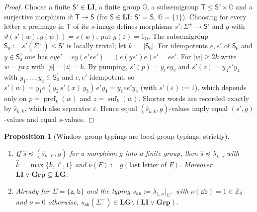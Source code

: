 \documentclass[11pt]{article}
\numberwithin{equation}{section}
\theoremstyle{plain}
\newtheorem{proposition}[theorem]{Proposition}
\theoremstyle{definition}
\theoremstyle{remark}
\newcommand{\eps}{\varepsilon}
\theoremstyle{plain}
\begin{document}
\begin{proof}
Choose a finite $\mathsf S'\in\mathbf{LI}$, a finite group ${\mathbb G}$, a subsemigroup
$\mathsf T\le \mathsf S'\times {\mathbb G}$ and a surjective morphism $\vartheta:\mathsf T\to\mathsf S$ (for
$\mathsf S\in\mathbf{LI}$: $\mathsf S'=\mathsf S$, ${\mathbb G}=\{1\}$).  Choosing for every letter a preimage in $\mathsf T$
of its $s$-image defines morphisms $s':\Sigma^+\to\mathsf S'$ and $g$ with
$\vartheta(s'(w),g(w))=s(w)$; put $g(\eps)=1_{\mathbb G}$.  The subsemigroup
$\mathsf S_0:=s'(\Sigma^+)\le \mathsf S'$ is locally trivial; let $k:=|\mathsf S_0|$.  For
idempotents $e,e'$ of $\mathsf S_0$ and $y\in \mathsf S_0^1$ one has
$eye'=ey(e'ee')=(e(ye')e)e'=ee'$.
For $|w|\ge2k$ write $w=pxz$ with $|p|=|z|=k$.  By pumping,
$s'(p)=y_1ey_2$ and $s'(z)=y_3e'y_4$ with $y_1,\ldots,y_4\in \mathsf S_0^1$ and $e,e'$
idempotent, so $s'(w)=y_1e\,(y_2\,s'(x)\,y_3)\,e'y_4=y_1ee'y_4$ (with $s'(\eps):=1$), which
depends only on $p=\operatorname{pref}_k(w)$ and $z=\operatorname{suf}_k(w)$.
Shorter words are recorded exactly by $\widehat s_{k,k}$, which also separates
$\eps$.  Hence equal $(\widehat s_{k,k},g)$-values imply equal $(s',g)$-values and
equal $s$-values.
\end{proof}

\begin{proposition}[Window--group typings are local-group typings, strictly]
\label{prop:li-g-strict}
\begin{enumerate}[label=\textup{(\roman*)},leftmargin=*]
\item If $\widehat s\preceq(\widehat s_{k,\ell},g)$ for a morphism $g$ into a finite
group, then $\widehat s\preceq\lambda_{\hat k,\nu}$ with $\hat k=\max\{k,\ell,1\}$ and
$\nu(F):=g(\text{last letter of }F)$.  Moreover $\mathbf{LI}\vee\mathbf{Grp}\subseteq\mathbf{LG}$.
\item Already for $\Sigma=\{\mathtt a,\mathtt b\}$ and
the typing $s_{\mathtt{ab}}:=\lambda_{1,\nu}|_{\Sigma^+}$ with
$\nu(\mathtt{ab})=1\in\mathbb Z_2$ and $\nu=0$ otherwise,
$s_{\mathtt{ab}}(\Sigma^+)\in\mathbf{LG}\setminus(\mathbf{LI}\vee\mathbf{Grp})$.
\end{enumerate}
\end{proposition}
\end{document}
